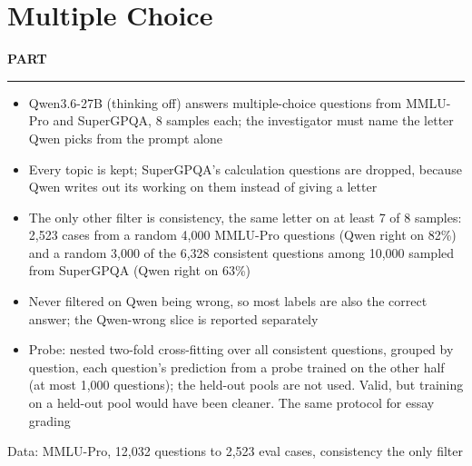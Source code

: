 \documentclass[aspectratio=169, 9pt, t]{beamer}
\newcommand{\parthead}{%
  {\color{accent}\usebeamerfont{date}\bfseries\addfontfeatures{LetterSpace=8}PART \insertsectionnumber\par}\vspace{0.3mm}
  {\displayfont\bfseries\fontsize{12}{14}\selectfont \insertsectionhead\par}\vspace{0.6mm}
  {\color{accent}\rule{\textwidth}{0.5pt}}\par\smallskip}
\begin{document}
\section{Multiple Choice}
\begin{frame}
  \parthead
  \begin{itemize}
    \item Qwen3.6-27B (thinking off) answers multiple-choice questions from MMLU-Pro and SuperGPQA, 8 samples each; the
      investigator must name the letter Qwen picks from the prompt alone
    \item Every topic is kept; SuperGPQA's calculation questions are dropped, because Qwen writes out its working on them
      instead of giving a letter
    \item The only other filter is consistency, the same letter on at least 7 of 8 samples: 2,523 cases from a random 4,000
      MMLU-Pro questions (Qwen right on 82\%) and a random 3,000 of the 6,328 consistent questions among 10,000 sampled from
      SuperGPQA (Qwen right on 63\%)
    \item Never filtered on Qwen being wrong, so most labels are also the correct answer; the Qwen-wrong slice is reported
      separately
    \item Probe: nested two-fold cross-fitting over all consistent questions, grouped by question, each question's prediction
      from a probe trained on the other half (at most 1,000 questions); the held-out pools are not used. Valid, but training on
      a held-out pool would have been cleaner. The same protocol for essay grading
  \end{itemize}
\end{frame}

\begin{frame}{Data: MMLU-Pro, 12,032 questions to 2,523 eval cases, consistency the only filter}
\end{frame}
\end{document}
